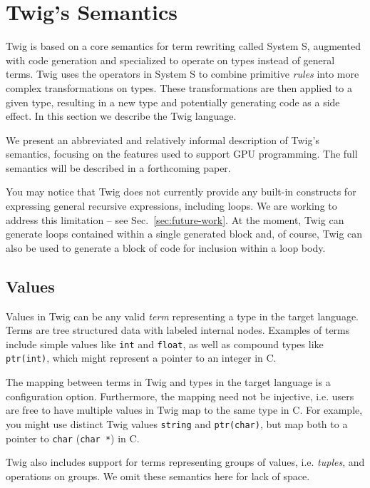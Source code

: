
\section{Twig's Semantics}
\label{sec:semantics}

Twig is based on a core semantics for term rewriting called System S\cite{system-s}, augmented with code generation and specialized to operate on types instead of general terms. Twig uses the operators in System S to combine primitive \emph{rules} into more complex transformations on types. These transformations are then applied to a given type, resulting in a new type and potentially generating code as a side effect. In this section we describe the Twig language.

We present an abbreviated and relatively informal description of Twig's semantics, focusing on the features used to support GPU programming. The full semantics will be described in a forthcoming paper.

You may notice that Twig does not currently provide any built-in constructs for expressing general recursive expressions, including loops. We are working to address this limitation -- see Sec.~\ref{sec:future-work}. At the moment, Twig can generate loops contained within a single generated block and, of course, Twig can also be used to generate a block of code for inclusion within a loop body.

\subsection{Values}

Values in Twig can be any valid \emph{term} representing a type in the target language. Terms are tree structured data with labeled internal nodes. Examples of terms include simple values like \texttt{int} and \texttt{float}, as well as compound types like \texttt{ptr(int)}, which might represent a pointer to an integer in C.

The mapping between terms in Twig and types in the target language is a configuration option. Furthermore, the mapping need not be injective, i.e. users are free to have multiple values in Twig map to the same type in C. For example, you might use distinct Twig values \texttt{string} and \texttt{ptr(char)}, but map both to a pointer to \texttt{char} (\texttt{char *}) in C.

Twig also includes support for terms representing groups of values, i.e. \emph{tuples}, and operations on groups. We omit these semantics here for lack of space.

